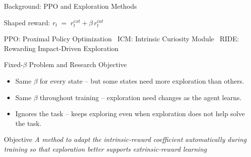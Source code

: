 \documentclass[10pt,aspectratio=169]{beamer}
\begin{document}
\begin{frame}{Background: PPO and Exploration Methods}
  
  \vspace{0.3em}
  \begin{center}\small
    Shaped reward: $\displaystyle r_t \;=\; r_t^{ext} + \beta\,r_t^{int}$
  \end{center}

  \vspace{0.2em}
  \begin{center}\scriptsize\color{softgray}
    PPO: Proximal Policy Optimization \textbullet\ ICM: Intrinsic Curiosity Module \textbullet\ RIDE: Rewarding Impact-Driven Exploration
  \end{center}
\end{frame}

\begin{frame}{Fixed-$\beta$ Problem and Research Objective}
  \vspace{1em}
  \begin{itemize}\small
    \setlength{\itemsep}{0.6em}
    \item Same $\beta$ for every state -- but some states need more exploration than others.
    \item Same $\beta$ throughout training -- exploration need changes as the agent learns.
    \item Ignores the task -- keeps exploring even when exploration does not help solve the task.
  \end{itemize}

  \vspace{1em}
  \begin{block}{Objective}
    \footnotesize\itshape A method to adapt the intrinsic-reward coefficient automatically during training so that exploration better supports extrinsic-reward learning
  \end{block}
\end{frame}
\end{document}
